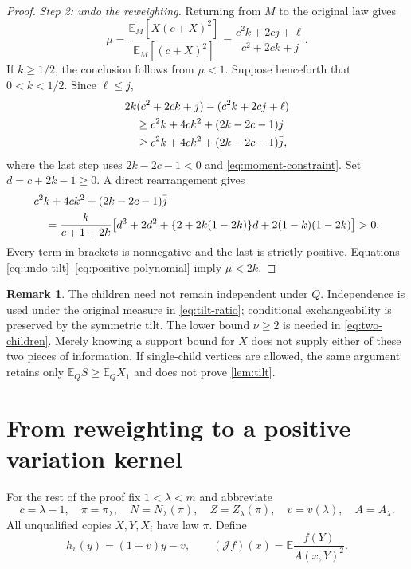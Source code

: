 \documentclass[11pt,a4paper]{article}
\numberwithin{equation}{section}
\theoremstyle{notethm}
\theoremstyle{definition}
\newtheorem{remark}[remark]{Remark}
\newcommand{\E}{\mathbb E}
\newcommand{\cJ}{\mathcal J}
\begin{document}
\begin{proof}
\emph{Step 2: undo the reweighting.}
Returning from $M$ to the original law gives
\begin{equation}\label{eq:undo-tilt}
 \mu=
 \frac{\E_M[X(c+X)^2]}{\E_M[(c+X)^2]}
 =\frac{c^2k+2cj+\ell}{c^2+2ck+j}.
\end{equation}
If $k\ge1/2$, the conclusion follows from $\mu<1$. Suppose henceforth that
$0<k<1/2$. Since $\ell\le j$,
\begin{align}
 &2k(c^2+2ck+j)-(c^2k+2cj+\ell)\notag\\
 &\hspace{1em}\ge c^2k+4ck^2+(2k-2c-1)j\notag\\
 &\hspace{1em}\ge c^2k+4ck^2+(2k-2c-1)\bar j,
 \label{eq:gap-bound}
\end{align}
where the last step uses $2k-2c-1<0$ and \eqref{eq:moment-constraint}.
Set $d=c+2k-1\ge0$. A direct rearrangement gives
\begin{align}
 &c^2k+4ck^2+(2k-2c-1)\bar j\notag\\
 &\quad=\frac{k}{c+1+2k}\bigl[
 d^3+2d^2+\{2+2k(1-2k)\}d
                  +2(1-k)(1-2k)\bigr]>0.
 \label{eq:positive-polynomial}
\end{align}
Every term in brackets is nonnegative and the last is strictly positive.
Equations \eqref{eq:undo-tilt}--\eqref{eq:positive-polynomial} imply $\mu<2k$.
\end{proof}

\begin{remark}\label{rem:why-two}
The children need not remain independent under $Q$. Independence is used
under the original measure in \eqref{eq:tilt-ratio}; conditional exchangeability
is preserved by the symmetric tilt. The lower bound
$\nu\ge2$ is needed in \eqref{eq:two-children}. Merely knowing a support bound
for $X$ does not supply either of these two pieces of information. If
single-child vertices are allowed, the same argument retains only
$\E_QS\ge \E_QX_1$ and does not prove \cref{lem:tilt}.
\end{remark}

\section{From reweighting to a positive variation kernel}\label{sec:kernel}

For the rest of the proof fix $1<\lambda<m$ and abbreviate
\begin{equation}\label{eq:basepoint}
 c=\lambda-1,\quad \pi=\pi_\lambda,\quad
 N=N_\lambda(\pi),\quad Z=Z_\lambda(\pi),\quad v=v(\lambda),
 \quad A=A_\lambda.
\end{equation}
All unqualified copies $X,Y,X_i$ have law $\pi$. Define
\begin{equation}\label{eq:J-h}
 h_v(y)=(1+v)y-v,
 \qquad
 (\cJ f)(x)=\E\frac{f(Y)}{A(x,Y)^2}.
\end{equation}
\end{document}
